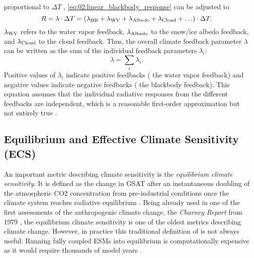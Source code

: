 proportional to $\Delta T$ \autocite{Gregory2008a},
\cref{eq:02:linear_blackbody_response} can be adjusted to
\begin{equation}
  R = \lambda \cdot \Delta T = \left( \lambda_{\textnormal{BB}} +
  \lambda_{\textnormal{WV}} + \lambda_{\textnormal{Albedo}} + \lambda_{\textnormal{Cloud}} +
  \ldots \right) \cdot \Delta T.
  \label{eq:02:linear_response}
\end{equation}
$\lambda_{\textnormal{WV}}$ refers to the water vapor feedback,
$\lambda_{\textnormal{Albedo}}$ to the snow/ice albedo feedback, and
$\lambda_{\textnormal{Cloud}}$ to the cloud feedback. Thus, the overall climate
feedback parameter $\lambda$ can be written as the sum of the individual
feedback parameters $\lambda_i$:
\begin{equation}
  \lambda = \sum_i \lambda_i.
  \label{eq:02:lambda_as_sum_of_lambdas}
\end{equation}
Positive values of $\lambda_i$ indicate positive feedbacks (\eg{} the water
vapor feedback) and negative values indicate negative feedbacks (\eg{} the
blackbody feedback). This equation assumes that the individual radiative
responses from the different feedbacks are independent, which is a reasonable
first-order approximation but not entirely true \autocite{Soden2008}.

\subsection{Equilibrium and Effective Climate Sensitivity (\acs{ECS})}
\label{subsec:02:ecs}

An important metric describing climate sensitivity is the \emph{equilibrium
  climate sensitivity}. It is defined as the change in \ac{GSAT} after an
instantaneous doubling of the atmospheric \ac{CO2} concentration from
pre-industrial conditions once the climate system reaches radiative equilibrium
\autocite{Bindoff2013}. Being already used in one of the first assessments of
the anthropogenic climate change, the \emph{Charney Report} from 1979
\autocite{Charney1979}, the equilibrium climate sensitivity is one of the
oldest metrics describing climate change. However, in practice this traditional
definition of is not always useful. Running fully coupled \acp{ESM} into
equilibrium is computationally expensive as it would require thousands of model
years \autocite{Rugenstein2020}.

